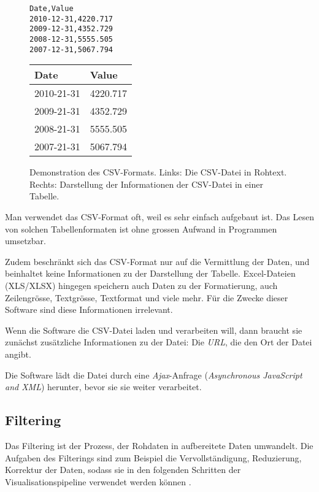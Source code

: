 \begin{figure}[!htbp]
	\centering
	\begin{minipage}{0.5\textwidth}
		\centering
		\begin{verbatim}
Date,Value
2010-12-31,4220.717
2009-12-31,4352.729
2008-12-31,5555.505
2007-12-31,5067.794
		\end{verbatim}
	\end{minipage}\hfill
	\begin{minipage}{0.5\textwidth}
		\centering
		\begin{tabular}{ | l | l |}
			\hline
			\textbf{Date} & \textbf{Value} \\ \hline
			2010-21-31 & 4220.717 \\ \hline
			2009-21-31 & 4352.729 \\ \hline
			2008-21-31 & 5555.505 \\ \hline
			2007-21-31 & 5067.794 \\ \hline
		\end{tabular}
	\end{minipage}
	\caption[Demonstration des CSV-Formats]{Demonstration des CSV-Formats. Links: Die CSV-Datei in Rohtext. Rechts: Darstellung der Informationen der CSV-Datei in einer Tabelle.}
	\label{fig:csv}
\end{figure}

Man verwendet das CSV-Format oft, weil es sehr einfach aufgebaut ist. Das Lesen von solchen Tabellenformaten ist ohne grossen Aufwand in Programmen umsetzbar. 

 Zudem beschränkt sich das CSV-Format nur auf die Vermittlung der Daten, und beinhaltet keine Informationen zu der Darstellung der Tabelle. Excel-Dateien (XLS/XLSX) hingegen speichern auch Daten zu der Formatierung, auch Zeilengrösse, Textgrösse, Textformat und viele mehr. Für die Zwecke dieser Software sind diese Informationen irrelevant.
 
 
Wenn die Software die CSV-Datei laden und verarbeiten will, dann braucht sie zunächst zusätzliche Informationen zu der Datei: Die \textit{URL}, die den Ort der Datei angibt.

Die Software lädt die Datei durch eine \textit{Ajax}-Anfrage (\textit{Asynchronous JavaScript and XML}) herunter, bevor sie sie weiter verarbeitet.

\subsection{Filtering}

Das Filtering ist der Prozess, der Rohdaten in aufbereitete Daten umwandelt. Die Aufgaben des Filterings sind zum Beispiel die Vervollständigung, Reduzierung, Korrektur der Daten, sodass sie in den folgenden Schritten der Visualisationspipeline verwendet werden können \cite[Kap. 2]{viz}.

